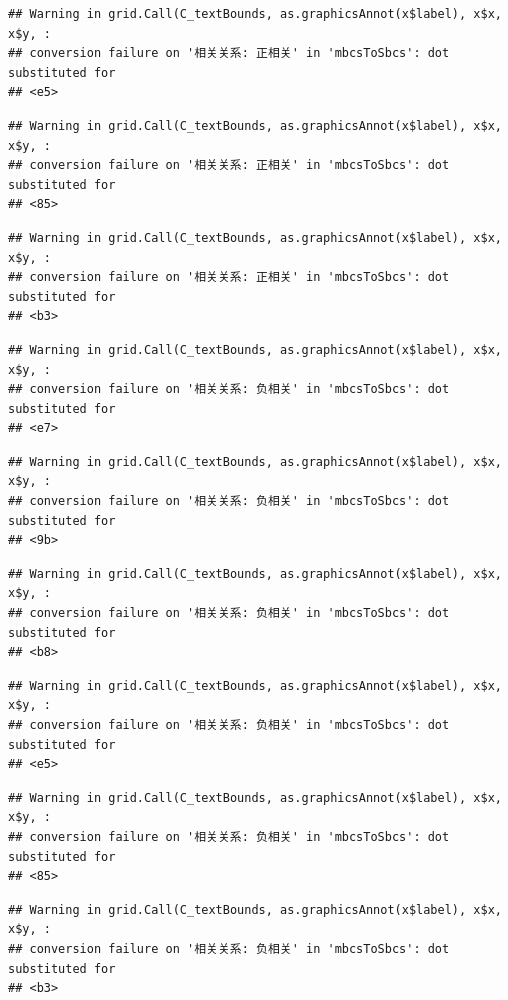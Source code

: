 \documentclass[
]{book}
\begin{document}
\begin{verbatim}
## Warning in grid.Call(C_textBounds, as.graphicsAnnot(x$label), x$x, x$y, :
## conversion failure on '相关关系: 正相关' in 'mbcsToSbcs': dot substituted for
## <e5>
\end{verbatim}

\begin{verbatim}
## Warning in grid.Call(C_textBounds, as.graphicsAnnot(x$label), x$x, x$y, :
## conversion failure on '相关关系: 正相关' in 'mbcsToSbcs': dot substituted for
## <85>
\end{verbatim}

\begin{verbatim}
## Warning in grid.Call(C_textBounds, as.graphicsAnnot(x$label), x$x, x$y, :
## conversion failure on '相关关系: 正相关' in 'mbcsToSbcs': dot substituted for
## <b3>
\end{verbatim}

\begin{verbatim}
## Warning in grid.Call(C_textBounds, as.graphicsAnnot(x$label), x$x, x$y, :
## conversion failure on '相关关系: 负相关' in 'mbcsToSbcs': dot substituted for
## <e7>
\end{verbatim}

\begin{verbatim}
## Warning in grid.Call(C_textBounds, as.graphicsAnnot(x$label), x$x, x$y, :
## conversion failure on '相关关系: 负相关' in 'mbcsToSbcs': dot substituted for
## <9b>
\end{verbatim}

\begin{verbatim}
## Warning in grid.Call(C_textBounds, as.graphicsAnnot(x$label), x$x, x$y, :
## conversion failure on '相关关系: 负相关' in 'mbcsToSbcs': dot substituted for
## <b8>
\end{verbatim}

\begin{verbatim}
## Warning in grid.Call(C_textBounds, as.graphicsAnnot(x$label), x$x, x$y, :
## conversion failure on '相关关系: 负相关' in 'mbcsToSbcs': dot substituted for
## <e5>
\end{verbatim}

\begin{verbatim}
## Warning in grid.Call(C_textBounds, as.graphicsAnnot(x$label), x$x, x$y, :
## conversion failure on '相关关系: 负相关' in 'mbcsToSbcs': dot substituted for
## <85>
\end{verbatim}

\begin{verbatim}
## Warning in grid.Call(C_textBounds, as.graphicsAnnot(x$label), x$x, x$y, :
## conversion failure on '相关关系: 负相关' in 'mbcsToSbcs': dot substituted for
## <b3>
\end{verbatim}
\end{document}

